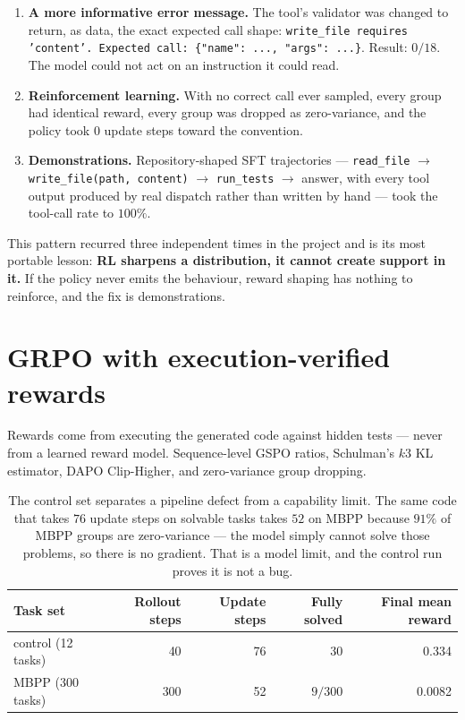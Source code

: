 \documentclass[10pt,a4paper]{article}
\newcommand{\code}[1]{\texttt{\small #1}}
\begin{document}
\begin{enumerate}
\item \textbf{A more informative error message.} The tool's validator was
changed to return, as data, the exact expected call shape:
\code{write\_file requires 'content'. Expected call: \{"name": ..., "args": ...\}}.
Result: $0/18$. The model could not act on an instruction it could read.
\item \textbf{Reinforcement learning.} With no correct call ever sampled, every
group had identical reward, every group was dropped as zero-variance, and the
policy took $0$ update steps toward the convention.
\item \textbf{Demonstrations.} Repository-shaped SFT trajectories ---
\code{read\_file} $\rightarrow$ \code{write\_file(path, content)} $\rightarrow$
\code{run\_tests} $\rightarrow$ answer, with every tool output produced by real
dispatch rather than written by hand --- took the tool-call rate to $100\%$.
\end{enumerate}

\noindent This pattern recurred three independent times in the project and is
its most portable lesson: \textbf{RL sharpens a distribution, it cannot create
support in it.} If the policy never emits the behaviour, reward shaping has
nothing to reinforce, and the fix is demonstrations.

\section{GRPO with execution-verified rewards}

Rewards come from executing the generated code against hidden tests --- never
from a learned reward model. Sequence-level GSPO ratios, Schulman's $k3$ KL
estimator, DAPO Clip-Higher, and zero-variance group dropping.

\begin{table}[h]
\centering\small
\begin{tabular}{@{}lrrrr@{}}
\toprule
\textbf{Task set} & \textbf{Rollout steps} & \textbf{Update steps} & \textbf{Fully solved} & \textbf{Final mean reward} \\
\midrule
control (12 tasks) & 40 & 76 & 30 & 0.334 \\
MBPP (300 tasks) & 300 & 52 & $9/300$ & 0.0082 \\
\bottomrule
\end{tabular}
\caption{The control set separates a pipeline defect from a capability limit.
The same code that takes $76$ update steps on solvable tasks takes $52$ on
MBPP because $91\%$ of MBPP groups are zero-variance --- the model simply cannot
solve those problems, so there is no gradient. That is a model limit, and the
control run proves it is not a bug.}
\end{table}
\end{document}
